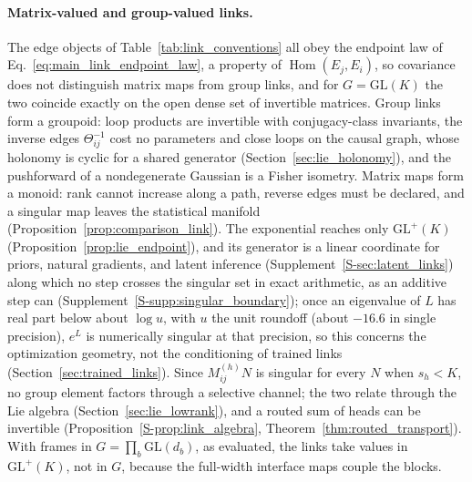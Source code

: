 \documentclass[twoside,11pt]{article}
\begin{document}
\paragraph{Matrix-valued and group-valued links.}
\label{sec:matrix_link_fields}
\label{sec:lie_motivation}
The edge objects of Table~\ref{tab:link_conventions} all obey the endpoint law of Eq.~\eqref{eq:main_link_endpoint_law}, a property of $\operatorname{Hom}(E_j,E_i)$, so covariance does not distinguish matrix maps from group links, and for $G=\mathrm{GL}(K)$ the two coincide exactly on the open dense set of invertible matrices. Group links form a groupoid: loop products are invertible with conjugacy-class invariants, the inverse edges $\Theta_{ij}^{-1}$ cost no parameters and close loops on the causal graph, whose holonomy is cyclic for a shared generator (Section~\ref{sec:lie_holonomy}), and the pushforward of a nondegenerate Gaussian is a Fisher isometry. Matrix maps form a monoid: rank cannot increase along a path, reverse edges must be declared, and a singular map leaves the statistical manifold (Proposition~\ref{prop:comparison_link}). The exponential reaches only $\mathrm{GL}^+(K)$ (Proposition~\ref{prop:lie_endpoint}), and its generator is a linear coordinate for priors, natural gradients, and latent inference (Supplement~\ref{S-sec:latent_links}) along which no step crosses the singular set in exact arithmetic, as an additive step can (Supplement~\ref{S-supp:singular_boundary}); once an eigenvalue of $L$ has real part below about $\log u$, with $u$ the unit roundoff (about $-16.6$ in single precision), $e^{L}$ is numerically singular at that precision, so this concerns the optimization geometry, not the conditioning of trained links (Section~\ref{sec:trained_links}). Since $M^{(h)}_{ij}N$ is singular for every $N$ when $s_h<K$, no group element factors through a selective channel; the two relate through the Lie algebra (Section~\ref{sec:lie_lowrank}), and a routed sum of heads can be invertible (Proposition~\ref{S-prop:link_algebra}, Theorem~\ref{thm:routed_transport}). With frames in $G=\prod_b\mathrm{GL}(d_b)$, as evaluated, the links take values in $\mathrm{GL}^+(K)$, not in $G$, because the full-width interface maps couple the blocks.
\end{document}
